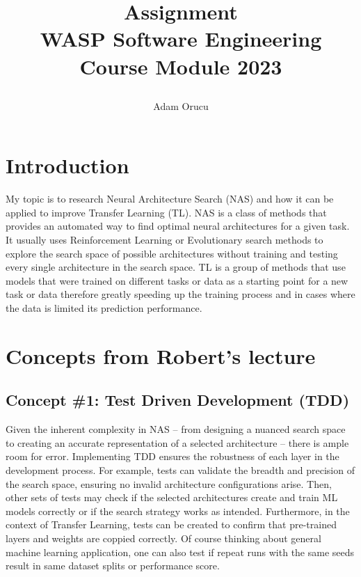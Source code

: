 \documentclass[11pt,a4paper]{article}
\title{%
Assignment \\
WASP Software Engineering Course Module 2023 \\
\author{Adam Orucu}
}
\date{}
\begin{document}
\maketitle
\section*{Introduction}


My topic is to research Neural Architecture Search (NAS) and how it can be applied to improve Transfer Learning (TL). NAS is a class of methods that provides an automated way to find optimal neural architectures for a given task. It usually uses Reinforcement Learning or Evolutionary search methods to explore the search space of possible architectures without training and testing every single architecture in the search space. TL is a group of methods that use models that were trained on different tasks or data as a starting point for a new task or data therefore greatly speeding up the training process and in cases where the data is limited its prediction performance.


\section*{Concepts from Robert's lecture}
\subsection*{Concept \#1: Test Driven Development (TDD)}
Given the inherent complexity in NAS – from designing a nuanced search space to creating an accurate representation of a selected architecture – there is ample room for error. Implementing TDD ensures the robustness of each layer in the development process. For example, tests can validate the breadth and precision of the search space, ensuring no invalid architecture configurations arise. Then, other sets of tests may check if the selected architectures create and train ML models correctly or if the search strategy works as intended.
Furthermore, in the context of Transfer Learning, tests can be created to confirm that pre-trained layers and weights are coppied correctly. Of course thinking about general machine learning application, one can also test if repeat runs with the same seeds result in same dataset splits or performance score.
\end{document}
